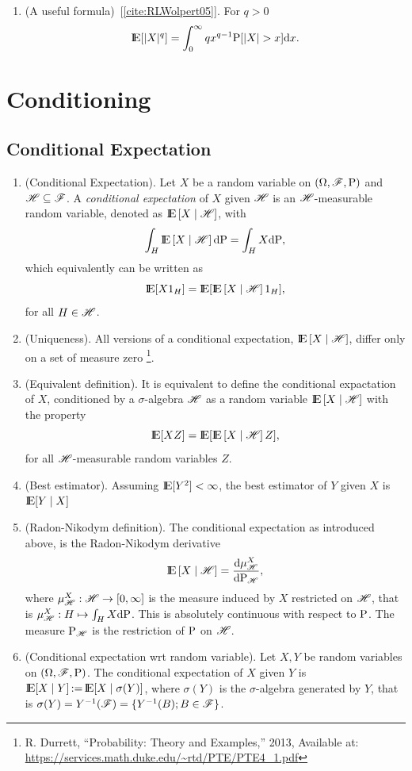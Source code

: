 \documentclass[a4paper,10pt]{article}
\newcommand{\ce}[1]{\E\left[#1 {}\mid{} \HH \right]}
\begin{document}
\begin{enumerate}
 \item (A useful formula)~[\ref{cite:RLWolpert05}]. For $q>0$
 \[
  \E[|X|^q] = \int_0^\infty q x^{q-1} \prob[|X|>x]\d x.
 \]	

\end{enumerate}


\section{Conditioning}
\subsection{Conditional Expectation}
\begin{enumerate}
 \item (Conditional Expectation). Let $X$ be a random variable on $(\Omega,\mathscr{F},\mathrm{P})$ and $\mathscr{H}\subseteq \mathscr{F}$.
       A \textit{conditional expectation} of $X$ given $\mathscr{H}$ is an $\mathscr{H}$-measurable 
       random variable, denoted as $\ce{X}$, with
       \[
        \int_H \ce{X} \d\prob = \int_H X\d\prob,
       \]
       which equivalently can be written as
       \[
        \E[X 1_H] = \E[\ce{X}1_H],
       \]
       for all $H\in\mathscr{H}$.
 \item (Uniqueness). All versions of a conditional expectation, $\ce{X}$, differ only on a 
       set of measure zero%
       \footnote{R. Durrett, ``Probability: Theory and Examples,'' 2013, Available at: \url{https://services.math.duke.edu/~rtd/PTE/PTE4_1.pdf}}.
 \item (Equivalent definition). It is equivalent to define the conditional expactation of $X$, 
       conditioned by a $\sigma$-algebra $\mathscr{H}$ as a random variable $\ce{X}$ with the property
       \[
        \E[X Z] = \E[\ce{X}Z],
       \]
       for all $\mathscr{H}$-measurable random variables $Z$.
 \item (Best estimator). Assuming $\E[Y^2]<\infty$, the best estimator of $Y$ given $X$ is $\E[Y{}\mid{}X]$      
 \item (Radon-Nikodym definition). The conditional expectation as introduced above, is the Radon-Nikodym
       derivative
       \[
          \ce{X} = \frac{\d \mu^X_{\HH}}{\d \prob_{\HH}},
       \]
      where $\mu^X_{\mathscr{H}}:\mathscr{H}\to [0,\infty]$ is the measure induced by $X$
      restricted on $\mathscr{H}$, that is $\mu^X_{\mathscr{H}}:H\mapsto \int_H X\mathrm{d}\mathrm{P}$.
      This is absolutely continuous with respect to $\mathrm{P}$. The measure $\mathrm{P}_{\mathscr{H}}$
      is the restriction of $\mathrm{P}$ on $\mathscr{H}$. 
      
 \item (Conditional expectation wrt random variable). Let $X,Y$ be random variables on $(\Omega,\mathscr{F},\mathrm{P})$.
       The conditional expectation of $X$ given $Y$ is $\E[X\mid Y]\dfn \E[X\mid \sigma(Y)]$,
       where $\sigma(Y)$ is the $\sigma$-algebra generated by $Y$, that is 
       $\sigma(Y) = Y^{-1}(\mathscr{F}) = \{Y^{-1}(B); B\in\mathscr{F}\}$.
       

\end{enumerate}
\end{document}
